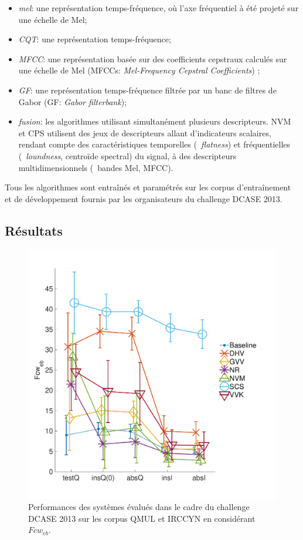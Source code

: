 \begin{itemize}
\item \emph{mel}: une représentation temps-fréquence, où l'axe fréquentiel à été projeté sur une échelle de Mel;
\item \emph{CQT}: une représentation temps-fréquence; %
\item \emph{MFCC}: une représentation basée sur des coefficients cepstraux calculés sur une échelle de Mel (MFCCs: \emph{Mel-Frequency Cepstral Coefficients}) \citep{Davis80a};
\item \emph{GF}: une représentation temps-fréquence filtrée par un banc de filtres de Gabor (GF: \emph{Gabor filterbank});
\item \emph{fusion}: les algorithmes utilisant simultanément plusieurs descripteurs. NVM et CPS utilisent des jeux de descripteurs allant d'indicateurs scalaires, rendant compte des caractéristiques temporelles (\eg~\emph{flatness}) et fréquentielles (\eg~\emph{loundness}, centroïde spectral) du signal, à des descripteurs multidimensionnels (\eg~bandes Mel, MFCC).
\end{itemize}


Tous les algorithmes sont entraînés et paramétrés sur les corpus d'entraînement et de développement fournis par les organisateurs du challenge DCASE 2013. \\

\subsection{Résultats}

\begin{figure}[t]
\includegraphics[width=1\columnwidth]{gfx/ch_7/dcase2013_1}
\caption{Performances des systèmes évalués dans le cadre du challenge DCASE 2013 sur les corpus QMUL et IRCCYN en considérant $Fcw_{eb}$.}
\label{fig:irccyn}
\end{figure}

